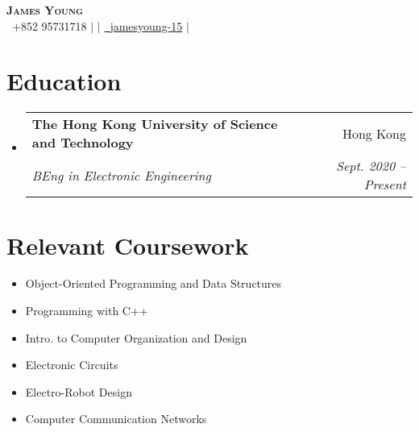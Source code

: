 \documentclass[letterpaper,12pt]{article}
\makeatletter
\newcommand{\resumeSubheading}[4]{
  \vspace{-2pt}\item
    \begin{tabular*}{0.97\textwidth}[t]{l@{\extracolsep{\fill}}r}
      \textbf{#1} & #2 \\
      \textit{\small#3} & \textit{\small #4} \\
    \end{tabular*}\vspace{-7pt}
}
\newcommand{\resumeSubHeadingListStart}{\begin{itemize}[leftmargin=0.15in, label={}]}
\newcommand{\resumeSubHeadingListEnd}{\end{itemize}}
\makeatother
\begin{document}
\begin{center}
    \textbf{\Huge \scshape James Young} \\ \vspace{2pt}
    \small  \faPhone\ {+852 95731718} $|$ 
    \href{mailto:jyyoungaa@connect.ust.hk}{} $|$ 
    \href{https://github.com/jamesyoung-15} {\faGithub\ {jamesyoung-15}} $|$
    \href{https://linkedin.com/in/jamesyyoung}{}
\end{center}


\section{Education}
  \resumeSubHeadingListStart
    \resumeSubheading
      {The Hong Kong University of Science and Technology}{Hong Kong}
      {BEng in Electronic Engineering}{Sept. 2020 -- Present}
  \resumeSubHeadingListEnd

\section{Relevant Coursework}
\vspace{-12pt}
    \begin{multicols}{2}
        \begin{itemize}[itemsep=-1pt, parsep=3pt]
        \small
            \item Object-Oriented Programming and Data Structures
            \item Programming with C++
            \item Intro. to Computer Organization and Design
            \item Electronic Circuits
            \item Electro-Robot Design
            \item Computer Communication Networks
        \end{itemize}
    \end{multicols}


\end{document}
